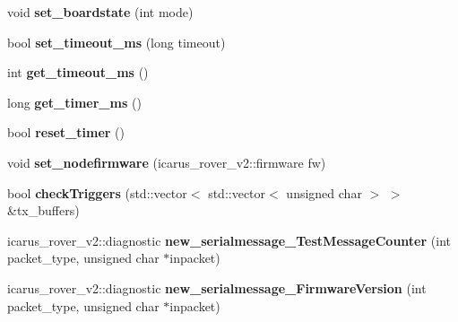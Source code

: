 \begin{DoxyCompactItemize}
void {\bfseries set\+\_\+boardstate} (int mode)
\item 
\mbox{\label{classBoardControllerNodeProcess_abeda1e69eb6f80ae2d5e7a27beac2f82}} 
bool {\bfseries set\+\_\+timeout\+\_\+ms} (long timeout)
\item 
\mbox{\label{classBoardControllerNodeProcess_acebfa1581e1491123356593ff3c5f53d}} 
int {\bfseries get\+\_\+timeout\+\_\+ms} ()
\item 
\mbox{\label{classBoardControllerNodeProcess_a2aab7e586198a1ed0805f61b8e5b586c}} 
long {\bfseries get\+\_\+timer\+\_\+ms} ()
\item 
\mbox{\label{classBoardControllerNodeProcess_ac66429dc48b753f161d7af524b129828}} 
bool {\bfseries reset\+\_\+timer} ()
\item 
\mbox{\label{classBoardControllerNodeProcess_a220326bb5230f7f2b1a2091fb8ac68e5}} 
void {\bfseries set\+\_\+nodefirmware} (icarus\+\_\+rover\+\_\+v2\+::firmware fw)
\item 
\mbox{\label{classBoardControllerNodeProcess_a28e054125a60f7e844b823cbe16113c5}} 
bool {\bfseries check\+Triggers} (std\+::vector$<$ std\+::vector$<$ unsigned char $>$ $>$ \&tx\+\_\+buffers)
\item 
\mbox{\label{classBoardControllerNodeProcess_a880a352786732f42d34c37ef27833f1f}} 
icarus\+\_\+rover\+\_\+v2\+::diagnostic {\bfseries new\+\_\+serialmessage\+\_\+\+Test\+Message\+Counter} (int packet\+\_\+type, unsigned char $\ast$inpacket)
\item 
\mbox{\label{classBoardControllerNodeProcess_ae2d6f5e1d8e683e976f215bfd30681cb}} 
icarus\+\_\+rover\+\_\+v2\+::diagnostic {\bfseries new\+\_\+serialmessage\+\_\+\+Firmware\+Version} (int packet\+\_\+type, unsigned char $\ast$inpacket)
\item 
\mbox{\label{classBoardControllerNodeProcess_a8a092c905583702d0facf730bc79f251}} 

\end{DoxyCompactItemize}
